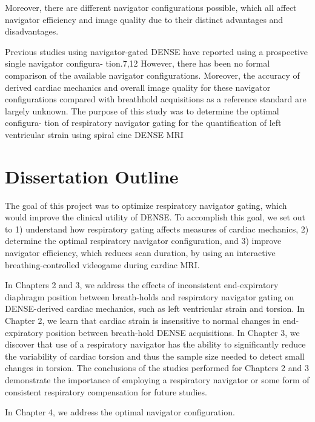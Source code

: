 	Moreover, there are different navigator configurations possible, which all affect navigator efficiency and image quality due to their distinct advantages and disadvantages.
	
	Previous studies using navigator-gated DENSE have
	reported using a prospective single navigator configura- tion.7,12 However, there has been no formal comparison of the available navigator configurations. Moreover, the accuracy of derived cardiac mechanics and overall image quality for these navigator configurations compared with breathhold acquisitions as a reference standard are largely unknown. The purpose of this study was to determine the optimal configura- tion of respiratory navigator gating for the quantification of left ventricular strain using spiral cine DENSE MRI

\section{Dissertation Outline}

The goal of this project was to optimize respiratory navigator gating, which would improve the clinical utility of DENSE. To accomplish this goal, we set out to 1) understand how respiratory gating affects measures of cardiac mechanics, 2) determine the optimal respiratory navigator configuration, and 3) improve navigator efficiency, which reduces scan duration, by using an interactive breathing-controlled videogame during cardiac MRI.

\indent In Chapters 2 and 3, we address the effects of inconsistent end-expiratory diaphragm position between breath-holds and respiratory navigator gating on DENSE-derived cardiac mechanics, such as left ventricular strain and torsion. In Chapter 2, we learn that cardiac strain is insensitive to normal changes in end-expiratory position between breath-hold DENSE acquisitions. In Chapter 3, we discover that use of a respiratory navigator has the ability to significantly reduce the variability of cardiac torsion and thus the sample size needed to detect small changes in torsion. The conclusions of the studies performed for Chapters 2 and 3 demonstrate the importance of employing a respiratory navigator or some form of consistent respiratory compensation for future studies.

\indent In Chapter 4, we address the optimal navigator configuration.

